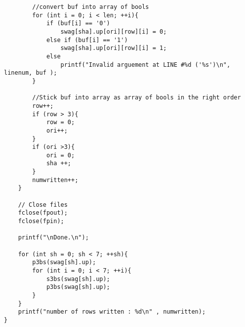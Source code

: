 \documentclass[letterpaper,titlepage,oneside]{article}
\begin{document}
\begin{lstlisting}
		//convert buf into array of bools
		for (int i = 0; i < len; ++i){
			if (buf[i] == '0')
				swag[sha].up[ori][row][i] = 0;
			else if (buf[i] == '1')
				swag[sha].up[ori][row][i] = 1;
			else
				printf("Invalid arguement at LINE #%d ('%s')\n", linenum, buf );
		}
	
		//Stick buf into array as array of bools in the right order
		row++;
		if (row > 3){
			row = 0;
			ori++;
		}
		if (ori >3){
			ori = 0;
			sha ++;
		}
		numwritten++;
	}

	// Close files
	fclose(fpout);
	fclose(fpin);
	
	printf("\nDone.\n");

	for (int sh = 0; sh < 7; ++sh){
		p3bs(swag[sh].up);
		for (int i = 0; i < 7; ++i){
			s3bs(swag[sh].up);
			p3bs(swag[sh].up);
		}
	}
	printf("number of rows written : %d\n" , numwritten);
}
\end{lstlisting}
\end{document}
